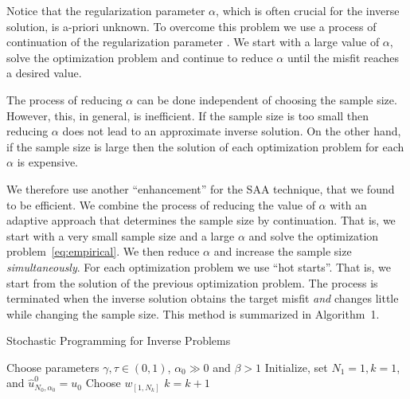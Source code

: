 \documentclass[12pt]{article}
\begin{document}
\bigskip

Notice that the regularization parameter $\alpha$, which is often crucial for the inverse solution, is a-priori unknown. To overcome this problem we use a process of continuation of the regularization
parameter \cite{hao}. We start with a large value of $\alpha$, solve the optimization problem and continue to reduce $\alpha$ until the misfit reaches a desired value.

The process of reducing $\alpha$ can be done independent of choosing the sample size. However, this, in general, is inefficient. If the sample size is too small then reducing $\alpha$ does not lead to an approximate inverse solution. On the other hand, if the sample size is large then the solution of each optimization problem for each $\alpha$ is expensive.

We therefore use another ``enhancement'' for the SAA technique, that we found to be efficient. We combine the process of reducing the value of $\alpha$ with an adaptive approach that determines the sample size by continuation. That is, we start with a very small sample size and a large $\alpha$ and solve the optimization problem~\eqref{eq:empirical}. We then reduce $\alpha$ and increase the sample size {\em simultaneously}.
For each optimization problem we use ``hot starts''. That is, we start from the solution of the previous optimization problem. The process is terminated when the inverse solution obtains the target misfit {\em and} changes little while changing the sample size. This method is summarized in Algorithm~1.
\begin{algorithm}
\caption{Stochastic Programming for Inverse Problems}
\begin{algorithmic}[1]
\STATE Choose parameters $\gamma, \tau \in (0,1)$, $\alpha_0 \gg 0$ and $ \beta > 1$
\STATE Initialize, set $N_{1}=1, k=1$, and $\widehat u^0_{N_0,\alpha_0} = u_{0}$
\STATE Choose $w_{[1,N_{k}]}$
\ENDIF
{}
\ENDIF
{}
\STATE $k = k+1$
 \ENDWHILE
 \end{algorithmic}
\label{al:al1}
\end{algorithm}
\end{document}
